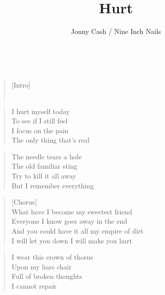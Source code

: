 \documentclass[9pt,a4paper,oneside, onecolumn]{article}
\author{Jonny Cash / Nine Inch Nails}
\title{Hurt}
\date{}
\begin{document}
\maketitle
\thispagestyle{empty}

\mbox{
}\\

\begin{verse}
[Intro]\\
\qquad{}\qquad{}\qquad{}\\
\end{verse}


\begin{verse}
I hurt myself today\\
To see if I still feel\\
I focus on the pain\\
The only thing that's real\\
\end{verse}

\begin{verse}
The needle tears a hole\\
The old familiar sting\\
Try to kill it all away\\
But I remember everything\\
\end{verse}


\begin{verse}
[Chorus]\\
What have I become my sweetest friend\\
Everyone I know goes away in the end\\
And you could have it all my empire of dirt\\
I will let you down I will make you hurt\\
\end{verse}

\begin{verse}
I wear this crown of thorns\\
Upon my liars chair\\
Full of broken thoughts\\
I cannot repair\\
\end{verse}
\end{document}
